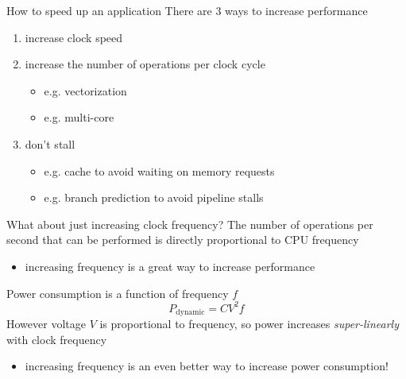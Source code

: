 \documentclass[aspectratio=43]{beamer}
\begin{document}
\begin{frame}[fragile]{}
    \begin{info}{How to speed up an application}
        There are 3 ways to increase performance
        \begin{enumerate}
            \item increase clock speed
            \item increase the number of operations per clock cycle
            \begin{itemize}
                \item e.g. vectorization
                \item e.g. multi-core
            \end{itemize}
            \item don't stall
            \begin{itemize}
                \item e.g. cache to avoid waiting on memory requests
                \item e.g. branch prediction to avoid pipeline stalls
            \end{itemize}
        \end{enumerate}
    \end{info}
\end{frame}

\begin{frame}[fragile]{}
    \begin{info}{What about just increasing clock frequency?}
        The number of operations per second that can be performed is directly proportional to CPU frequency
        \begin{itemize}
            \item increasing frequency is a great way to increase performance
        \end{itemize}
        Power consumption is a function of frequency $f$
        $$P_{\text{dynamic}}=CV^2f$$
        However voltage $V$ is proportional to frequency, so power increases \emph{super-linearly} with clock frequency
        \begin{itemize}
            \item increasing frequency is an even better way to increase power consumption!
        \end{itemize}
    \end{info}

\end{frame}
\end{document}
